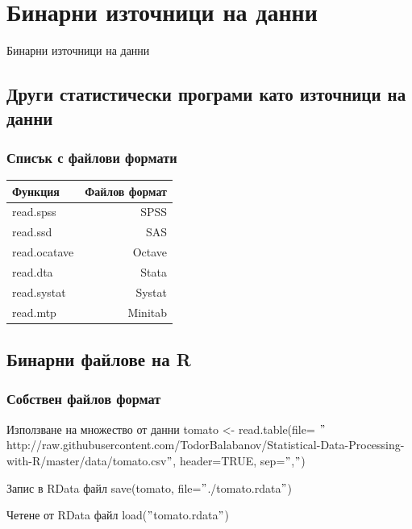 \documentclass{beamer}
\begin{document}
\section{Бинарни източници на данни}

\begin{frame}
\center \huge{Бинарни източници на данни}
\end{frame}

\subsection{Други статистически програми като източници на данни}

\begin{frame}
\frametitle{Списък с файлови формати}
\begin{table}[ht]
\centering
\begin{tabular}{|l|r|} 
 \hline
  Функция & Файлов формат \\ [0.1ex] 
  \hline\hline
  read.spss & SPSS \\
  \hline
  read.ssd & SAS \\
  \hline
  read.ocatave & Octave \\
  \hline
  read.dta & Stata \\
  \hline
  read.systat & Systat \\
  \hline
  read.mtp & Minitab \\
  \hline
\end{tabular}
\end{table}
\end{frame}

\subsection{Бинарни файлове на R}

\begin{frame}
\frametitle{Собствен файлов формат}
\begin{block}{Използване на множество от данни}
tomato <- read.table(file= $"$http://raw.githubusercontent.com/TodorBalabanov/Statistical-Data-Processing-with-R/master/data/tomato.csv$"$, header=TRUE, sep=$"$,$"$)
\end{block}

\begin{block}{Запис в RData файл}
save(tomato, file=$"$./tomato.rdata$"$)
\end{block}

\begin{block}{Четене от RData файл}
load($"$tomato.rdata$"$)
\end{block}
\end{frame}
\end{document}
